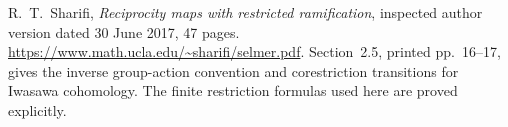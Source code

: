R.~T.~Sharifi,
\emph{Reciprocity maps with restricted ramification},
inspected author version dated 30 June 2017, 47 pages.
\url{https://www.math.ucla.edu/~sharifi/selmer.pdf}.
Section~2.5, printed pp.~16--17, gives the inverse group-action
convention and corestriction transitions for Iwasawa cohomology.
The finite restriction formulas used here are proved explicitly.
